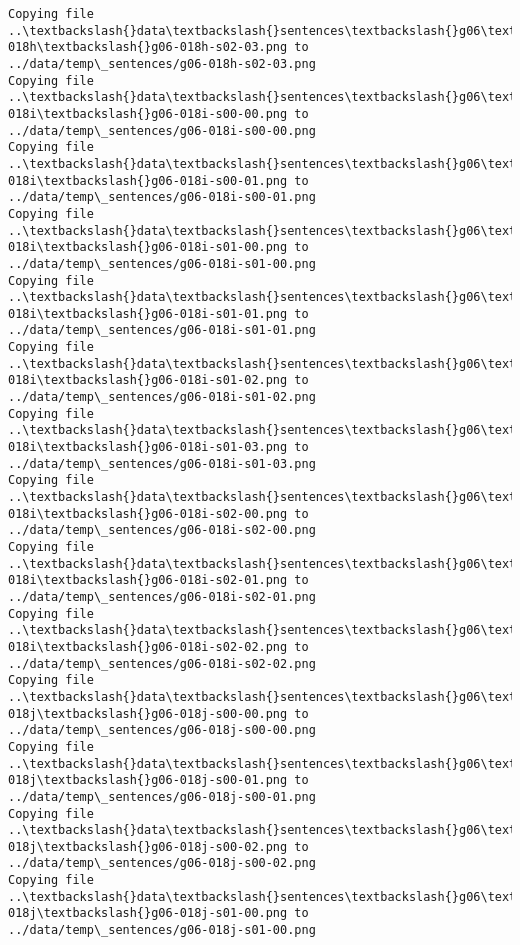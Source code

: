 \documentclass[11pt]{article}
\begin{document}
\begin{Verbatim}[commandchars=\\\{\}]
Copying file ..\textbackslash{}data\textbackslash{}sentences\textbackslash{}g06\textbackslash{}g06-018h\textbackslash{}g06-018h-s02-03.png to
../data/temp\_sentences/g06-018h-s02-03.png
Copying file ..\textbackslash{}data\textbackslash{}sentences\textbackslash{}g06\textbackslash{}g06-018i\textbackslash{}g06-018i-s00-00.png to
../data/temp\_sentences/g06-018i-s00-00.png
Copying file ..\textbackslash{}data\textbackslash{}sentences\textbackslash{}g06\textbackslash{}g06-018i\textbackslash{}g06-018i-s00-01.png to
../data/temp\_sentences/g06-018i-s00-01.png
Copying file ..\textbackslash{}data\textbackslash{}sentences\textbackslash{}g06\textbackslash{}g06-018i\textbackslash{}g06-018i-s01-00.png to
../data/temp\_sentences/g06-018i-s01-00.png
Copying file ..\textbackslash{}data\textbackslash{}sentences\textbackslash{}g06\textbackslash{}g06-018i\textbackslash{}g06-018i-s01-01.png to
../data/temp\_sentences/g06-018i-s01-01.png
Copying file ..\textbackslash{}data\textbackslash{}sentences\textbackslash{}g06\textbackslash{}g06-018i\textbackslash{}g06-018i-s01-02.png to
../data/temp\_sentences/g06-018i-s01-02.png
Copying file ..\textbackslash{}data\textbackslash{}sentences\textbackslash{}g06\textbackslash{}g06-018i\textbackslash{}g06-018i-s01-03.png to
../data/temp\_sentences/g06-018i-s01-03.png
Copying file ..\textbackslash{}data\textbackslash{}sentences\textbackslash{}g06\textbackslash{}g06-018i\textbackslash{}g06-018i-s02-00.png to
../data/temp\_sentences/g06-018i-s02-00.png
Copying file ..\textbackslash{}data\textbackslash{}sentences\textbackslash{}g06\textbackslash{}g06-018i\textbackslash{}g06-018i-s02-01.png to
../data/temp\_sentences/g06-018i-s02-01.png
Copying file ..\textbackslash{}data\textbackslash{}sentences\textbackslash{}g06\textbackslash{}g06-018i\textbackslash{}g06-018i-s02-02.png to
../data/temp\_sentences/g06-018i-s02-02.png
Copying file ..\textbackslash{}data\textbackslash{}sentences\textbackslash{}g06\textbackslash{}g06-018j\textbackslash{}g06-018j-s00-00.png to
../data/temp\_sentences/g06-018j-s00-00.png
Copying file ..\textbackslash{}data\textbackslash{}sentences\textbackslash{}g06\textbackslash{}g06-018j\textbackslash{}g06-018j-s00-01.png to
../data/temp\_sentences/g06-018j-s00-01.png
Copying file ..\textbackslash{}data\textbackslash{}sentences\textbackslash{}g06\textbackslash{}g06-018j\textbackslash{}g06-018j-s00-02.png to
../data/temp\_sentences/g06-018j-s00-02.png
Copying file ..\textbackslash{}data\textbackslash{}sentences\textbackslash{}g06\textbackslash{}g06-018j\textbackslash{}g06-018j-s01-00.png to
../data/temp\_sentences/g06-018j-s01-00.png

\end{Verbatim}
\end{document}
